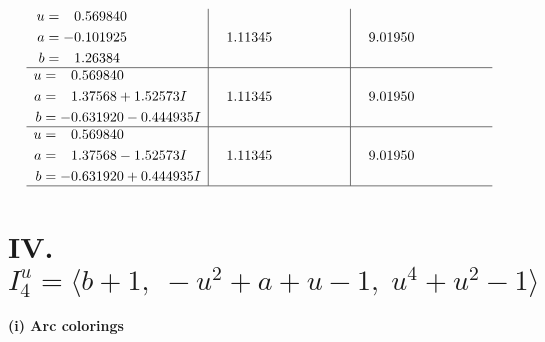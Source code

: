 \documentclass[1p]{elsarticle_modified}
\theoremstyle{definition}
\begin{document}
$$\begin{array}{c|c|c}
\begin{aligned}
u &= \phantom{-}0.569840\phantom{ +0.000000I} \\
a &= -0.101925\phantom{ +0.000000I} \\
b &= \phantom{-}1.26384\phantom{ +0.000000I}\end{aligned}
 & \phantom{-}1.11345\phantom{ +0.000000I} & \phantom{-}9.01950\phantom{ +0.000000I} \\ \hline\begin{aligned}
u &= \phantom{-}0.569840\phantom{ +0.000000I} \\
a &= \phantom{-}1.37568 + 1.52573 I \\
b &= -0.631920 - 0.444935 I\end{aligned}
 & \phantom{-}1.11345\phantom{ +0.000000I} & \phantom{-}9.01950\phantom{ +0.000000I} \\ \hline\begin{aligned}
u &= \phantom{-}0.569840\phantom{ +0.000000I} \\
a &= \phantom{-}1.37568 - 1.52573 I \\
b &= -0.631920 + 0.444935 I\end{aligned}
 & \phantom{-}1.11345\phantom{ +0.000000I} & \phantom{-}9.01950\phantom{ +0.000000I}\\
 \hline 
 \end{array}$$\newpage\newpage\renewcommand{\arraystretch}{1}
\centering \section*{IV. $I^u_{4}= \langle b+1,\;- u^2+a+u-1,\;u^4+u^2-1 \rangle$}
\flushleft \textbf{(i) Arc colorings}\\
\end{document}
